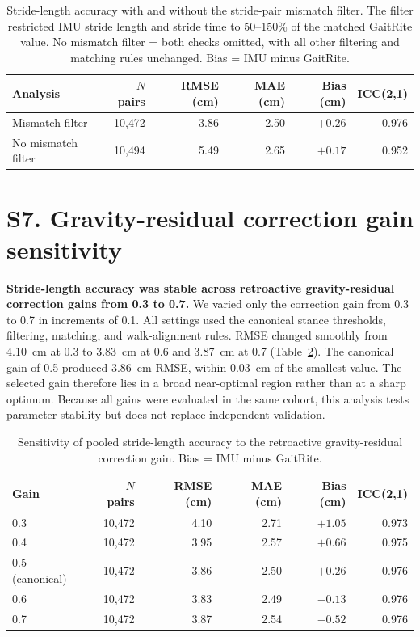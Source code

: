 \documentclass[fleqn,10pt,lineno]{wlpeerj}
\begin{document}
\begin{table}[!ht]
\centering
\caption{Stride-length accuracy with and without the stride-pair mismatch filter. The filter restricted IMU stride length and stride time to 50--150\% of the matched GaitRite value. No mismatch filter = both checks omitted, with all other filtering and matching rules unchanged. Bias = IMU minus GaitRite.}
\label{tab:s_ratio_sensitivity}
\small
\begin{tabular}{@{}lrrrrr@{}}
\toprule
Analysis & $N$ pairs & RMSE (cm) & MAE (cm) & Bias (cm) & ICC(2,1) \\
\midrule
Mismatch filter    & 10{,}472 & 3.86 & 2.50 & $+0.26$ & 0.976 \\
No mismatch filter & 10{,}494 & 5.49 & 2.65 & $+0.17$ & 0.952 \\
\bottomrule
\end{tabular}
\end{table}


\section*{S7. Gravity-residual correction gain sensitivity}

\textbf{Stride-length accuracy was stable across retroactive gravity-residual correction gains from 0.3 to 0.7.} We varied only the correction gain from 0.3 to 0.7 in increments of 0.1. All settings used the canonical stance thresholds, filtering, matching, and walk-alignment rules. RMSE changed smoothly from 4.10~cm at 0.3 to 3.83~cm at 0.6 and 3.87~cm at 0.7 (Table~\ref{tab:s_gain_sensitivity}). The canonical gain of 0.5 produced 3.86~cm RMSE, within 0.03~cm of the smallest value. The selected gain therefore lies in a broad near-optimal region rather than at a sharp optimum. Because all gains were evaluated in the same cohort, this analysis tests parameter stability but does not replace independent validation.

\begin{table}[!ht]
\centering
\caption{Sensitivity of pooled stride-length accuracy to the retroactive gravity-residual correction gain. Bias = IMU minus GaitRite.}
\label{tab:s_gain_sensitivity}
\small
\begin{tabular}{@{}lrrrrr@{}}
\toprule
Gain & $N$ pairs & RMSE (cm) & MAE (cm) & Bias (cm) & ICC(2,1) \\
\midrule
0.3 & 10{,}472 & 4.10 & 2.71 & $+1.05$ & 0.973 \\
0.4 & 10{,}472 & 3.95 & 2.57 & $+0.66$ & 0.975 \\
0.5 (canonical) & 10{,}472 & 3.86 & 2.50 & $+0.26$ & 0.976 \\
0.6 & 10{,}472 & 3.83 & 2.49 & $-0.13$ & 0.976 \\
0.7 & 10{,}472 & 3.87 & 2.54 & $-0.52$ & 0.976 \\
\bottomrule
\end{tabular}
\end{table}
\end{document}
